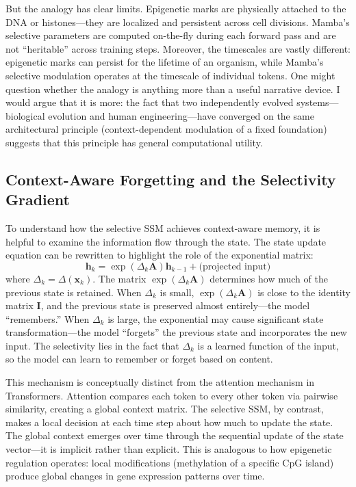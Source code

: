 \documentclass[12pt,a4paper]{article}
\renewcommand{\vec}[1]{\mathbf{#1}}
\begin{document}
But the analogy has clear limits. Epigenetic marks are physically attached to the DNA or histones---they are localized and persistent across cell divisions. Mamba's selective parameters are computed on-the-fly during each forward pass and are not ``heritable'' across training steps. Moreover, the timescales are vastly different: epigenetic marks can persist for the lifetime of an organism, while Mamba's selective modulation operates at the timescale of individual tokens. One might question whether the analogy is anything more than a useful narrative device. I would argue that it is more: the fact that two independently evolved systems---biological evolution and human engineering---have converged on the same architectural principle (context-dependent modulation of a fixed foundation) suggests that this principle has general computational utility.

\subsection{Context-Aware Forgetting and the Selectivity Gradient}
\label{sec:mamba-forgetting}

To understand how the selective SSM achieves context-aware memory, it is helpful to examine the information flow through the state. The state update equation can be rewritten to highlight the role of the exponential matrix:
\begin{equation}
\vec{h}_k = \exp(\Delta_k \mathbf{A}) \vec{h}_{k-1} + \text{(projected input)} \label{eq:mamba-exp}
\end{equation}
where $\Delta_k = \Delta(\vec{x}_k)$. The matrix $\exp(\Delta_k \mathbf{A})$ determines how much of the previous state is retained. When $\Delta_k$ is small, $\exp(\Delta_k \mathbf{A})$ is close to the identity matrix $\mathbf{I}$, and the previous state is preserved almost entirely---the model ``remembers.'' When $\Delta_k$ is large, the exponential may cause significant state transformation---the model ``forgets'' the previous state and incorporates the new input. The selectivity lies in the fact that $\Delta_k$ is a learned function of the input, so the model can learn to remember or forget based on content.

This mechanism is conceptually distinct from the attention mechanism in Transformers. Attention compares each token to every other token via pairwise similarity, creating a global context matrix. The selective SSM, by contrast, makes a local decision at each time step about how much to update the state. The global context emerges over time through the sequential update of the state vector---it is implicit rather than explicit. This is analogous to how epigenetic regulation operates: local modifications (methylation of a specific CpG island) produce global changes in gene expression patterns over time.
\end{document}
